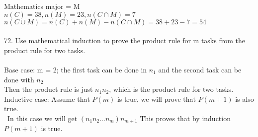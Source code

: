 \documentclass[11pt, oneside]{article}   	%
\begin{document}
Mathematics major = M\\
$n(C) = 38, n(M) = 23, n(C\cap M) = 7$\\
$n(C\cup M) = n(C) + n(M) - n(C\cap M) = 38 + 23 - 7 = 54 $\\\\ 
72. Use mathematical induction to prove the product rule for m tasks from the product rule for two tasks.\\\\
Base case: m = 2; the first task can be done in $n_1$ and the second task can be done with $n_2$\\
Then the product rule is just $n_1n_2$, which is the product rule for two tasks. \\
Inductive case: Assume that $P(m)$ is true, we will prove that $P(m + 1)$ is also true.\\\ 
In this case we will get $(n_1n_2...n_m)n_{m+1}$ This proves that by induction $P(m+1)$ is true.\\\\
\end{document}
